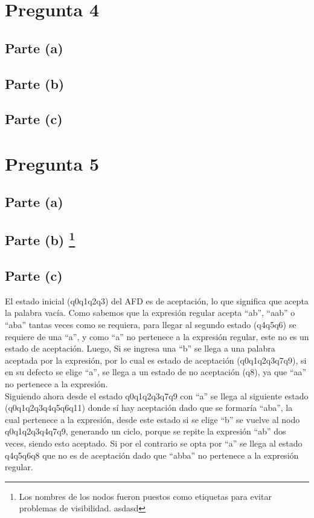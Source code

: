 \documentclass[11pt,letterpaper]{article}
\begin{document}
\section{Pregunta 4}
\subsection{Parte (a)}
\subsection{Parte (b)}
\subsection{Parte (c)}

\section{Pregunta 5}
\subsection{Parte (a)}
\renewcommand{\thefootnote}{\fnsymbol{footnote}}
\subsection{Parte (b) \protect\footnote{Los nombres de los nodos fueron puestos como etiquetas para evitar problemas de visibilidad. asdasd}}


\newpage
\subsection{Parte (c)}

El estado inicial (q0q1q2q3) del AFD es de aceptación, lo que significa que acepta la palabra vacía. Como sabemos que la expresión regular acepta “ab”, “aab” o “aba” tantas veces como se requiera, para llegar al segundo estado (q4q5q6) se requiere de una “a”, y como “a” no pertenece a la expresión regular, este no es un estado de aceptación. Luego, Si se ingresa una “b” se llega a una palabra aceptada por la expresión, por lo cual es estado de aceptación (q0q1q2q3q7q9), si en su defecto se elige “a”, se llega a un estado de no aceptación (q8), ya que “aa” no pertenece a la expresión. \\

Siguiendo ahora desde el estado q0q1q2q3q7q9 con “a” se llega al siguiente estado (q0q1q2q3q4q5q6q11) donde sí hay aceptación dado que se formaría “aba”, la cual pertenece a la expresión, desde este estado si se elige “b” se vuelve al nodo q0q1q2q3q4q7q9, generando un ciclo, porque se repite la expresión “ab” dos veces, siendo esto aceptado. Si por el contrario se opta por “a” se llega al estado q4q5q6q8 que no es de aceptación dado que “abba” no pertenece a la expresión regular. \\
\end{document}
